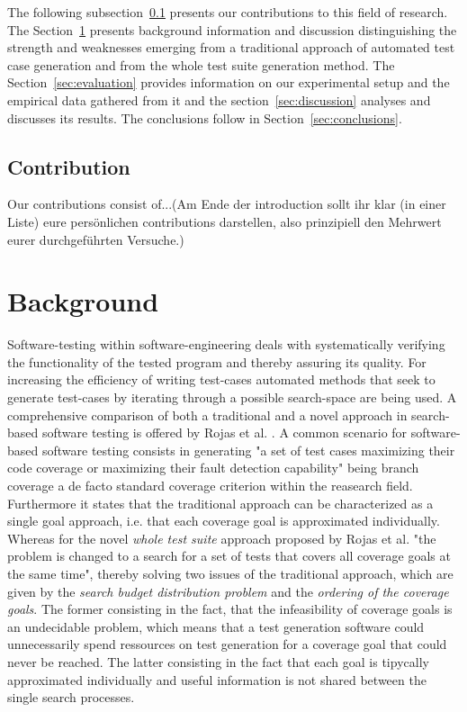 \documentclass[pdftex,english,oribibl]{llncs}
\begin{document}
The following subsection~\ref{subsec:anotherContribution} presents our contributions to this field of research.
The Section~\ref{sec:anotherSection} presents background information and discussion distinguishing the strength and weaknesses emerging from a traditional approach of automated test case generation and from the whole test suite generation method. 
The Section~\ref{sec:evaluation} provides information on our experimental setup and the empirical data gathered from it and the section~\ref{sec:discussion} analyses and discusses its results.
  The conclusions follow in Section~\ref{sec:conclusions}.

\subsection{Contribution}\label{subsec:anotherContribution}

Our contributions consist of...(Am Ende der introduction sollt ihr klar (in einer Liste) eure persönlichen contributions darstellen, also prinzipiell den Mehrwert eurer durchgeführten Versuche.)


\section{Background}\label{sec:anotherSection}
Software-testing within software-engineering deals with systematically verifying the functionality of the tested program and thereby assuring its quality. For increasing the efficiency of writing test-cases automated methods that seek to generate test-cases by iterating through a possible search-space are being used. A comprehensive comparison of both a traditional and a novel approach in search-based software testing is offered by Rojas et al. \citep{rojas2017detailed}. A common scenario for software-based software testing consists in generating "a set of test cases maximizing their code coverage or maximizing their fault detection capability" being branch coverage a de facto standard coverage criterion within the reasearch field. Furthermore it states that the traditional approach can be characterized as a single goal approach, i.e. that each coverage goal is approximated individually. Whereas for the novel \textit{whole test suite} approach proposed by Rojas et al. "the problem is changed to a search for a set of tests that covers all coverage goals at the same time", thereby solving two issues of the traditional approach, which are given by the \textit{search budget distribution problem} and the \textit{ordering of the coverage goals}. The former consisting in the fact, that the infeasibility of coverage goals is an undecidable problem, which means that a test generation software could unnecessarily spend ressources on test generation for a coverage goal that could never be reached. The latter consisting in the fact that each goal is tipycally approximated individually and useful information is not shared between the single search processes. 
\end{document}
